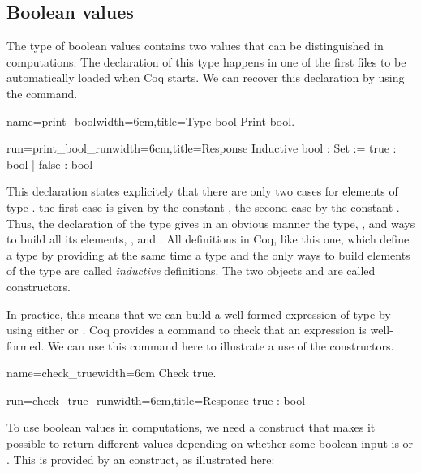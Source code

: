 \subsection{Boolean values}
The type  of boolean values contains two values that can be
distinguished in computations.  The declaration of this type happens
in one of the first files to be automatically loaded when Coq starts.
We can recover this declaration by using the  command.

\begin{coq}{name=print_bool}{width=6cm,title=Type bool}
Print bool.
\end{coq}
\begin{coqout}{run=print_bool_run}{width=6cm,title=Response}
Inductive bool : Set := true : bool | false : bool
\end{coqout}
This declaration states explicitely that there are only two cases for
elements of type .  the first case is given by the constant
, the second case by the constant .  Thus, the
declaration of the type gives in an obvious manner the type, ,
and ways to build all its elements, , and .  All definitions
in Coq, like this one, which define a type by providing at the same
time a type and the only ways to build elements of the type are called {\em
  inductive} definitions.  The two objects  and  are
called constructors.

In practice, this means that we can build a well-formed expression of
type  by using either  or .  Coq provides a
command to check that an expression is well-formed.  We can use this
command here to illustrate a use of the constructors.

\begin{coq}{name=check_true}{width=6cm}
Check true.
\end{coq}
\begin{coqout}{run=check_true_run}{width=6cm,title=Response}
true : bool
\end{coqout}

To use boolean values in computations, we need a construct that makes
it possible to return different values depending on whether some
boolean input is  or .  This is provided by an  construct, as illustrated here:

